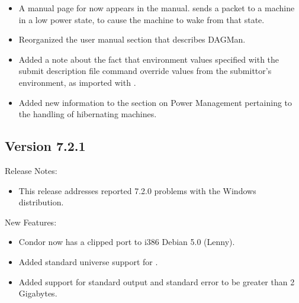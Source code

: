 \begin{itemize}

\item A manual page for  now appears in the manual.
 sends a packet to a machine in a low power state,
to cause the machine to wake from that state.

\item Reorganized the user manual section that describes DAGMan.

\item Added a note about the fact that environment values specified
with the  submit description file command override values from
the submittor's environment, as imported with .

\item Added new information to the section on Power Management
  pertaining to the handling of hibernating machines.
  

\end{itemize}


\subsection*{\label{sec:New-7-2-1}Version 7.2.1}

\noindent Release Notes:

\begin{itemize}

\item This release addresses reported 7.2.0 problems with the
Windows distribution.

\end{itemize}


\noindent New Features:

\begin{itemize}

\item Condor now has a clipped port to i386 Debian 5.0 (Lenny).

\item Added standard universe support for .

\item Added support for standard output and standard error to be greater
than 2 Gigabytes.

\end{itemize}

